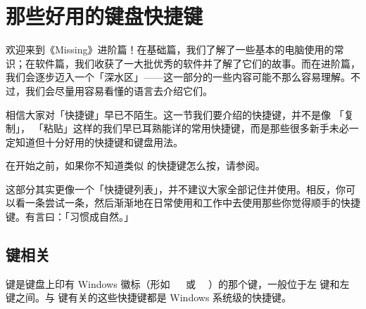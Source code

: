 \chapter{那些好用的键盘快捷键}
\label{shortcut-keys}

\begin{note}
  欢迎来到《Missing》进阶篇！在基础篇，我们了解了一些基本的电脑使用的常识；在软件篇，我们收获了一大批优秀的软件并了解了它们的故事。而在进阶篇，我们会逐步迈入一个「深水区」——这一部分的一些内容可能不那么容易理解。不过，我们会尽量用容易看懂的语言去介绍它们。
\end{note}

\begin{intro}
  相信大家对「快捷键」早已不陌生。这一节我们要介绍的快捷键，并不是像  「复制」， 「粘贴」这样的我们早已耳熟能详的常用快捷键，而是那些很多新手未必一定知道但十分好用的快捷键和键盘用法。
\end{intro}

在开始之前，如果你不知道类似  的快捷键怎么按，请参阅。

这部分其实更像一个「快捷键列表」，并不建议大家全部记住并使用。相反，你可以看一条尝试一条，然后渐渐地在日常使用和工作中去使用那些你觉得顺手的快捷键。有言曰：「习惯成自然。」

\section{\texorpdfstring{ 键相关}{Windows 键相关}}

 键是键盘上印有 Windows 徽标（形如\  \ 或\  \,）的那个键，一般位于左  键和左  键之间。与  键有关的这些快捷键都是 Windows 系统级的快捷键。

